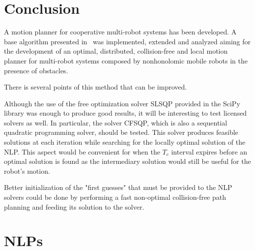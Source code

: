 \documentclass[12pt]{book}
\numberwithin{equation}{section}
\begin{document}

\setcounter{page}{1}
\mainmatter
\tableofcontents






\chapter{Conclusion}

A motion planner for cooperative multi-robot systems has been developed. A base algorithm presented in~\cite{Defoort2009} was implemented, extended and analyzed aiming for the development of an optimal, distributed, collision-free and local motion planner for multi-robot systems composed by nonhonolomic mobile robots in  the presence of obstacles.

There is several points of this method that can be improved.

Although the use of the free optimization solver SLSQP provided in the SciPy library was enough to produce good results, it will be interesting to test licensed solvers as well. In particular, the solver CFSQP, which is also a sequential quadratic programming solver, should be tested. This solver produces feasible solutions at each iteration while searching for the locally optimal solution of the NLP. This aspect would be convenient for when the $T_c$ interval expires before an optimal solution is found as the intermediary solution would still be useful for the robot's motion.

Better initialization of the "first guesses" that must be provided to the NLP solvers could be done by performing a fast non-optimal collision-free path planning and feeding its solution to the solver.

\nocite{*}




\appendix
\chapter{NLPs}
\end{document}
